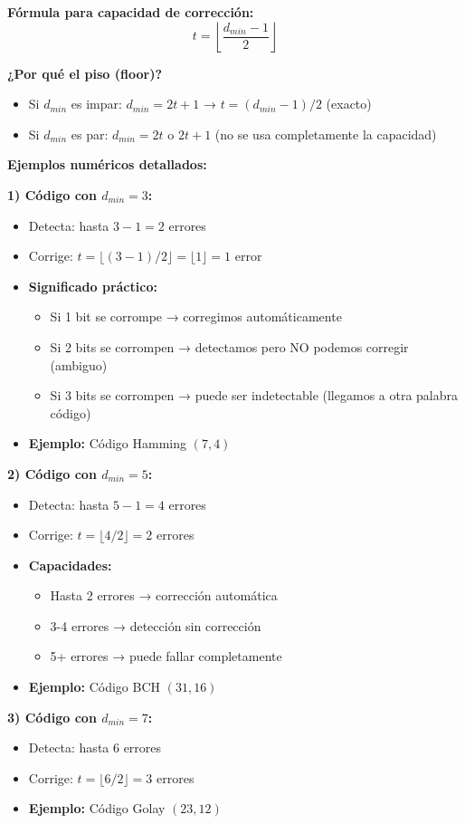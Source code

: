 \documentclass[10pt,a4paper]{article}
\begin{document}
\textbf{Fórmula para capacidad de corrección:}
$$t = \left\lfloor \frac{d_{min}-1}{2} \right\rfloor$$

\textbf{¿Por qué el piso (floor)?}
\begin{itemize}
\item Si $d_{min}$ es impar: $d_{min} = 2t+1$ → $t = (d_{min}-1)/2$ (exacto)
\item Si $d_{min}$ es par: $d_{min} = 2t$ o $2t+1$ (no se usa completamente la capacidad)
\end{itemize}

\textbf{Ejemplos numéricos detallados:}

\textbf{1) Código con $d_{min} = 3$:}
\begin{itemize}
\item Detecta: hasta $3-1 = 2$ errores
\item Corrige: $t = \lfloor (3-1)/2 \rfloor = \lfloor 1 \rfloor = 1$ error
\item \textbf{Significado práctico:}
  \begin{itemize}
  \item Si 1 bit se corrompe → corregimos automáticamente
  \item Si 2 bits se corrompen → detectamos pero NO podemos corregir (ambiguo)
  \item Si 3 bits se corrompen → puede ser indetectable (llegamos a otra palabra código)
  \end{itemize}
\item \textbf{Ejemplo:} Código Hamming $(7,4)$
\end{itemize}

\textbf{2) Código con $d_{min} = 5$:}
\begin{itemize}
\item Detecta: hasta $5-1 = 4$ errores
\item Corrige: $t = \lfloor 4/2 \rfloor = 2$ errores
\item \textbf{Capacidades:}
  \begin{itemize}
  \item Hasta 2 errores → corrección automática
  \item 3-4 errores → detección sin corrección
  \item 5+ errores → puede fallar completamente
  \end{itemize}
\item \textbf{Ejemplo:} Código BCH $(31,16)$
\end{itemize}

\textbf{3) Código con $d_{min} = 7$:}
\begin{itemize}
\item Detecta: hasta 6 errores
\item Corrige: $t = \lfloor 6/2 \rfloor = 3$ errores
\item \textbf{Ejemplo:} Código Golay $(23,12)$
\end{itemize}
\end{document}
